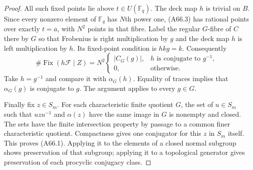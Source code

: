 \documentclass[11pt,oneside]{article}
\begin{document}
\begin{proof}
All such fixed points lie above $t\in U(\mathbb F_q)$.
The deck map $h$ is trivial on $B$.
Since every nonzero element of $\mathbb F_q$
has $N$th power one, (A66.3) has rational points
over exactly $t=\overline a$, with $N^2$ points
in that fibre. Label the regular $G$-fibre
of $C$ there by $G$ so that Frobenius is right
multiplication by $g$ and the deck map $h$ is
left multiplication by $h$.
Its fixed-point condition is $hkg=k$.
Consequently
\[
 \#\operatorname{Fix}(h\mathcal F\mid Z)
  =N^2
    \begin{cases}
      |C_G(g)|,&h\text{ is conjugate to }g^{-1},\\
      0,&\text{otherwise}.
    \end{cases}                                      \tag{A66.5}
\]
Take $h=g^{-1}$ and compare it with
$\alpha_G(h)$. Equality of traces implies that
$\alpha_G(g)$ is conjugate to $g$.
The argument applies to every $g\in G$.

Finally fix $z\in S_m$. For each characteristic
finite quotient $G$, the set of $u\in S_m$ such
that $u z u^{-1}$ and $\alpha(z)$ have the same
image in $G$ is nonempty and closed.
The sets have the finite intersection property
by passage to a common finer characteristic
quotient. Compactness gives one conjugator for
this $z$ in $S_m$ itself. This proves (A66.1).
Applying it to the elements of a closed normal
subgroup shows preservation of that subgroup;
applying it to a topological generator gives
preservation of each procyclic conjugacy class.
\end{proof}
\end{document}
